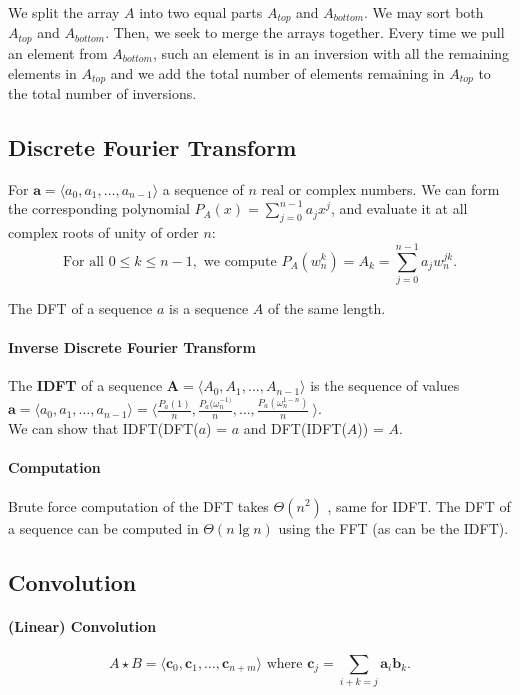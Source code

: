 We split the array \(A\) into two equal parts \(A_{top}\) and \(A_{bottom}\).
We may sort both \(A_{top}\) and \(A_{bottom}\).
Then, we seek to merge the arrays together. Every time we pull an element from
\(A_{bottom}\), such an element is in an inversion with all the remaining elements
in \(A_{top}\) and we add the total number of elements remaining in \(A_{top}\)
to the total number of inversions. 

\subsection{Discrete Fourier Transform}
For \(\boldsymbol{a}=\langle a_0, a_1, \dots, a_{n-1} \rangle\) a sequence of \(n\)
real or complex numbers. We can form the corresponding polynomial \(P_A(x) = \sum_{j=0}^{n-1}
a_jx^j\), and evaluate it at all complex roots of unity of order \(n\):
\[\text{For all } 0\leq k\leq n-1, \text{ we compute } P_A(w_n^k)=A_k=\sum_{j=0}^{n-1}a_jw_n^{jk}.\]

The DFT of a sequence \(a\) is a sequence \(A\) of the same length.

\paragraph{Inverse Discrete Fourier Transform}
The \textbf{IDFT} of a sequence \(\boldsymbol{A}=\langle A_0, A_1, \dots, A_{n-1} \rangle\)
is the sequence of values \(\boldsymbol{a} = \langle a_0, a_1, \dots, a_{n-1} \rangle = 
\langle \frac{P_a(1)}{n}, \frac{P_a(\omega_n^{-1)}}{n}, \dots, 
\frac{P_a(\omega_n^{1-n})}{n}\ \rangle\). \\[0.2cm]
We can show  that IDFT(DFT(\(a\)) = \(a\) and DFT(IDFT(\(A\))) = \(A\).

\paragraph{Computation} Brute force computation of the DFT takes \(\Theta(n^2)\)
, same for IDFT. The DFT of a sequence can be computed in \(\Theta(n\lg n)\)
 using the FFT (as can be the IDFT).

 \subsection{Convolution}
 \paragraph{(Linear) Convolution}
 \[
    A \star B = \langle \boldsymbol{c}_0, \boldsymbol{c}_1, \dots, \boldsymbol{c}_{n+m} \rangle
    \text{ where } \boldsymbol{c}_j = \sum_{i+k=j} \boldsymbol{a}_i \boldsymbol{b}_k.
\]

